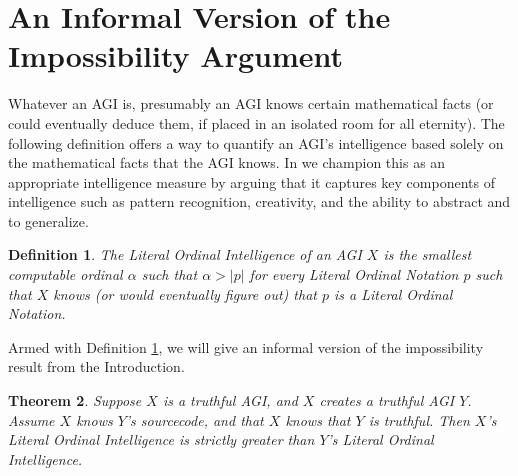 \documentclass[runningheads]{llncs}
\newtheorem{mytheorem}{Theorem}
\newtheorem{mydefinition}[mytheorem]{Definition}
\begin{document}
\section{An Informal Version of the Impossibility Argument}
\label{informalargumentsection}

Whatever an AGI is, presumably an AGI knows certain mathematical facts
(or could eventually deduce them, if placed in an isolated room for all eternity).
The following definition offers a way to quantify an AGI's intelligence based
solely on the mathematical facts that the AGI knows. In \cite{alexander2019measuring}
we champion this as an appropriate intelligence measure by arguing that it
captures key components of intelligence such as pattern recognition, creativity, and
the ability to abstract and to generalize.

\begin{mydefinition}
\label{maindefinition}
    The \emph{Literal Ordinal Intelligence} of an AGI $X$ is the smallest computable
    ordinal $\alpha$ such that $\alpha>|p|$ for every Literal Ordinal Notation
    $p$ such that $X$ knows (or would eventually figure out) that $p$ is a
    Literal Ordinal Notation.
\end{mydefinition}

Armed with Definition \ref{maindefinition}, we will give an informal version of the
impossibility result from the Introduction.

\begin{mytheorem}
\label{maintheorem}
    Suppose $X$ is a truthful AGI, and $X$ creates a truthful AGI $Y$.
    Assume $X$ knows $Y$'s sourcecode, and that $X$ knows that $Y$ is truthful.
    Then $X$'s Literal Ordinal Intelligence is strictly greater than $Y$'s
    Literal Ordinal Intelligence.
\end{mytheorem}
\end{document}
